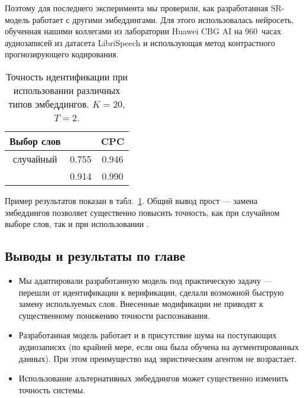 Поэтому для последнего эксперимента мы проверили, как разработанная SR-модель
работает с другими эмбеддингами. Для этого использовалась нейросеть, обученная
нашими коллегами из лаборатории Huawei CBG AI на 960~часах аудиозаписей из
датасета LibriSpeech\cite{librispeech} и использующая метод контрастного
прогнозирующего кодирования\cite{oord2019representation}.

\begin{table}[htb]
    \centering
    \begin{tabular}{c c c}
        \toprule
        Выбор слов & \xvector{} & CPC\\
        \midrule
        случайный & 0.755 & 0.946\\
        \enquirer{} & 0.914 & 0.990\\
        \bottomrule
    \end{tabular}
    \caption{Точность идентификации при использовании различных типов
    эмбеддингов. $K = 20$, $T = 2$.}
    \label{tab:cpc}
\end{table}

Пример результатов показан в табл.~\ref{tab:cpc}. Общий вывод прост --- замена
эмбеддингов позволяет существенно повысить точность, как при случайном выборе
слов, так и при использовании \enquirer{}.

\subsection{Выводы и результаты по главе}

\begin{itemize}
    \item Мы адаптировали разработанную модель под практическую задачу ---
    перешли от идентификации к верификации, сделали возможной быструю замену
    используемых слов. Внесенные модификации не приводят к существенному понижению
    точности распознавания.
    \item Разработанная модель работает и в присутствие шума на поступающих
    аудиозаписях (по крайней мере, если она была обучена на аугментированных
    данных). При этом преимущество \enquirer{} над эвристическим агентом не
    возрастает.
    \item Использование альтернативных эмбеддингов может существенно изменить
    точность системы.
\end{itemize}